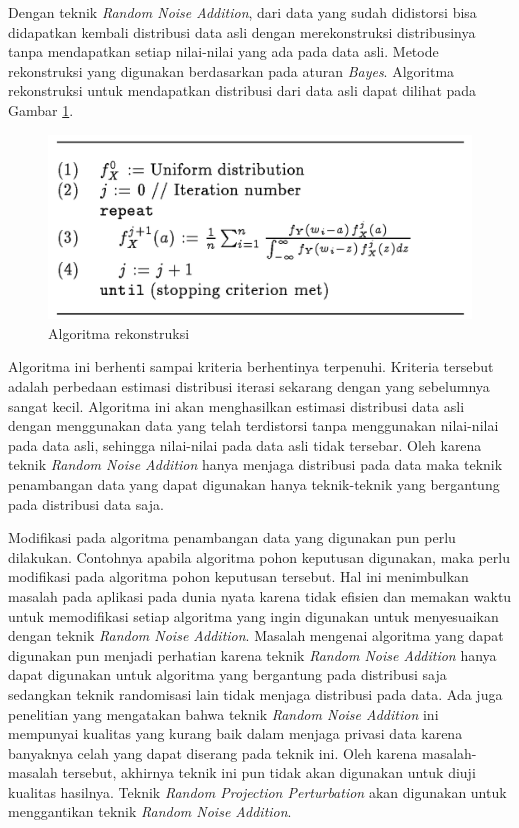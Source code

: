 \documentclass[a4paper,twoside]{article}
\begin{document}
\begin{enumerate}
		Dengan teknik \textit{Random Noise Addition}, dari data yang sudah didistorsi bisa didapatkan kembali distribusi data asli dengan merekonstruksi distribusinya tanpa mendapatkan setiap nilai-nilai yang ada pada data asli. Metode rekonstruksi yang digunakan berdasarkan pada aturan \textit{Bayes}. Algoritma rekonstruksi untuk mendapatkan distribusi dari data asli dapat dilihat pada Gambar \ref{fig:rnaalgorithm}.
		
		\begin{figure}
			\centering
			\includegraphics[scale=0.4]{rnaalgorithm}
			\caption{Algoritma rekonstruksi}
			\label{fig:rnaalgorithm}
		\end{figure}

		Algoritma ini berhenti sampai kriteria berhentinya terpenuhi. Kriteria tersebut adalah perbedaan estimasi distribusi iterasi sekarang dengan yang sebelumnya sangat kecil. Algoritma ini akan menghasilkan estimasi distribusi data asli dengan menggunakan data yang telah terdistorsi tanpa menggunakan nilai-nilai pada data asli, sehingga nilai-nilai pada data asli tidak tersebar. Oleh karena teknik \textit{Random Noise Addition} hanya menjaga distribusi pada data maka teknik penambangan data yang dapat digunakan hanya teknik-teknik yang bergantung pada distribusi data saja.

		Modifikasi pada algoritma penambangan data yang digunakan pun perlu dilakukan. Contohnya apabila algoritma pohon keputusan digunakan, maka perlu modifikasi pada algoritma pohon keputusan tersebut. Hal ini menimbulkan masalah pada aplikasi pada dunia nyata karena tidak efisien dan memakan waktu untuk memodifikasi setiap algoritma yang ingin digunakan untuk menyesuaikan dengan teknik \textit{Random Noise Addition}. Masalah mengenai algoritma yang dapat digunakan pun menjadi perhatian karena teknik \textit{Random Noise Addition} hanya dapat digunakan untuk algoritma yang bergantung pada distribusi saja sedangkan teknik randomisasi lain tidak menjaga distribusi pada data. Ada juga penelitian yang mengatakan bahwa teknik \textit{Random Noise Addition} ini mempunyai kualitas yang kurang baik dalam menjaga privasi data karena banyaknya celah yang dapat diserang pada teknik ini. Oleh karena masalah-masalah tersebut, akhirnya teknik ini pun tidak akan digunakan untuk diuji kualitas hasilnya. Teknik \textit{Random Projection Perturbation} akan digunakan untuk menggantikan teknik \textit{Random Noise Addition}.


\end{enumerate}
\end{document}
